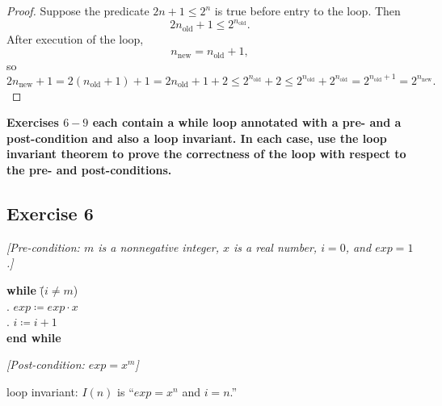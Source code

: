 \documentclass[14pt]{extarticle}
\newcommand{\cy}{\color{cyan}}
\begin{document}
\begin{proof}
    Suppose the predicate $2n + 1 \leq 2^n$ is true before entry to the loop. Then
    \[
        2n_{\text{old}} + 1 \leq 2^{n_{\text{old}}}.
    \]
    After execution of the loop,
    \[
        n_{\text{new}} = n_{\text{old}} + 1,
    \]
    so
    \[
        2n_{\text{new}} + 1 = 2(n_{\text{old}} + 1) + 1 = 2n_{\text{old}} + 1 + 2 \leq 2^{n_{\text{old}}} + 2 \leq 2^{n_{\text{old}}} + 2^{n_{\text{old}}} = 2^{n_{\text{old}} + 1} = 2^{n_{\text{new}}}.
    \]
\end{proof}

{\bf \cy Exercises $6-9$ each contain a while loop annotated with a pre- and a post-condition and also a loop
invariant. In each case, use the loop invariant theorem to prove the correctness of the loop with respect to the pre-
and post-conditions.}

\subsection{Exercise 6}
{\it [Pre-condition: $m$ is a nonnegative integer, $x$ is a real number, $i = 0$, and $exp = 1$.]}

\begin{tabbing}
    {\bf while} \= ($i \neq m$) \\
    . $exp \coloneqq exp \cdot x$ \\
    . $i \coloneqq i + 1$ \\
    {\bf end while}
\end{tabbing}

{\it [Post-condition: $exp = x^m$]}

loop invariant: $I(n)$ is ``$exp = x^n$ and $i = n$.''
\end{document}
